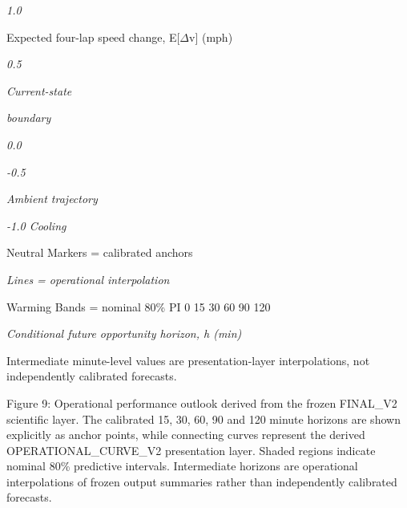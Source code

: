 \begin{center}\textit{1.0}\end{center}

Expected four-lap speed change, E[\ensuremath{\Delta}v] (mph)

\begin{center}\textit{0.5}\end{center}

\begin{center}\textit{Current-state}\end{center}

\begin{center}\textit{boundary}\end{center}

\begin{center}\textit{0.0}\end{center}

\begin{center}\textit{-0.5}\end{center}

\begin{center}\textit{Ambient trajectory}\end{center}

\begin{center}\textit{-1.0             Cooling}\end{center}

Neutral Markers = calibrated anchors

\begin{center}\textit{Lines = operational interpolation}\end{center}

Warming Bands = nominal 80\% PI 0 15 30 60 90 120

\begin{center}\textit{Conditional future opportunity horizon, h (min)}\end{center}

Intermediate minute-level values are presentation-layer interpolations, not independently calibrated forecasts.

Figure 9: Operational performance outlook derived from the frozen FINAL\_V2 scientific layer. The calibrated 15, 30, 60, 90 and 120 minute horizons are shown explicitly as anchor points, while connecting curves represent the derived OPERATIONAL\_CURVE\_V2 presentation layer. Shaded regions indicate nominal 80\% predictive intervals. Intermediate horizons are operational interpolations of frozen output summaries rather than independently calibrated forecasts.

